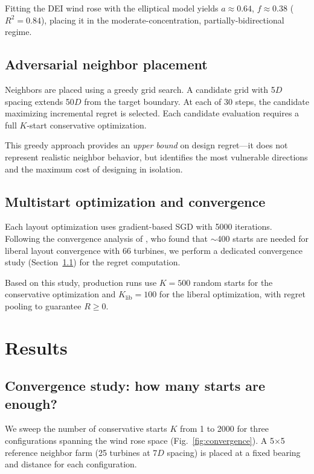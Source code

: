 \documentclass[manuscript, 12pt]{copernicus}
\begin{document}
Fitting the DEI wind rose with the elliptical model yields $a \approx 0.64$, $f \approx 0.38$ ($R^2 = 0.84$), placing it in the moderate-concentration, partially-bidirectional regime.

\subsection{Adversarial neighbor placement}

Neighbors are placed using a greedy grid search.
A candidate grid with 5$D$ spacing extends 50$D$ from the target boundary.
At each of 30 steps, the candidate maximizing incremental regret is selected.
Each candidate evaluation requires a full $K$-start conservative optimization.

This greedy approach provides an \emph{upper bound} on design regret---it does not represent realistic neighbor behavior, but identifies the most vulnerable directions and the maximum cost of designing in isolation.

\subsection{Multistart optimization and convergence}

Each layout optimization uses gradient-based SGD with 5000 iterations.
Following the convergence analysis of \citet{Quick2026omae}, who found that $\sim$400 starts are needed for liberal layout convergence with 66 turbines, we perform a dedicated convergence study (Section~\ref{sec:convergence}) for the regret computation.

Based on this study, production runs use $K = 500$ random starts for the conservative optimization and $K_\text{lib} = 100$ for the liberal optimization, with regret pooling to guarantee $R \geq 0$.

\section{Results}\label{sec:results}

\subsection{Convergence study: how many starts are enough?}\label{sec:convergence}

We sweep the number of conservative starts $K$ from 1 to 2000 for three configurations spanning the wind rose space (Fig.~\ref{fig:convergence}).
A 5$\times$5 reference neighbor farm (25 turbines at 7$D$ spacing) is placed at a fixed bearing and distance for each configuration.
\end{document}
